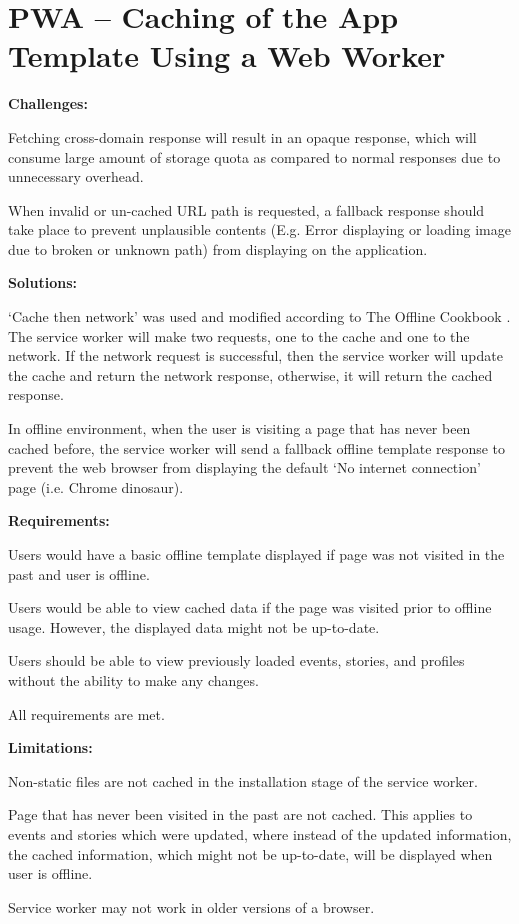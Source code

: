 \documentclass[11pt, a4paper]{article}
\begin{document}
\section{PWA – Caching of the App Template Using a Web Worker}
\textbf{Challenges:}
\begin{enumerate*}[label=\textbf{\arabic*})]
\item Fetching cross-domain response will result in an opaque response, which will consume large
amount of storage quota as compared to normal responses \cite{opaque_workbox} due to unnecessary
overhead.
\item When invalid or un-cached URL path is requested, a fallback response should take place
to prevent unplausible contents (E.g. Error displaying or loading image due to broken or unknown
path)
from displaying on the application.
\end{enumerate*}
%
\textbf{Solutions:}
\begin{enumerate*}[label=\textbf{\arabic*})]
\item `Cache then network' was used and modified according to The Offline Cookbook
\cite{offline_cookbook}. The service worker will make two requests, one to the cache and one to the
network. If the network request is successful, then the service worker will update the cache and
return the network response, otherwise, it will return the cached response.
\item In offline environment, when the user is visiting a page that has never been cached before,
the service worker will send a fallback offline template response to prevent the web browser from
displaying the default `No internet connection' page (i.e. Chrome dinosaur).
\end{enumerate*}
%
\textbf{Requirements:}
\begin{enumerate*}[label=\textbf{\arabic*})]
\item Users would have a basic offline template displayed if page was not visited in the past and
user is offline.
\item Users would be able to view cached data if the page was visited prior to offline usage.
However, the displayed data might not be up-to-date.
\item Users should be able to view previously loaded events, stories, and profiles without the
ability to make any changes.
\item All requirements are met.
\end{enumerate*}
%
\textbf{Limitations:}
\begin{enumerate*}[label=\textbf{\arabic*})]
\item Non-static files are not cached in the installation stage of the service worker.
\item Page that has never been visited in the past are not cached. This applies to events and
stories which were updated, where instead of the updated information, the cached information, which
might not be up-to-date, will be displayed when user is offline.
\item Service worker may not work in older versions of a browser.
\end{enumerate*}
\end{document}
